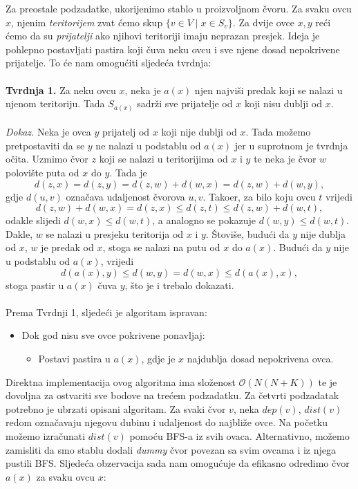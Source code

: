 Za preostale podzadatke, ukorijenimo stablo u proizvoljnom čvoru. Za svaku ovcu $x$, njenim \emph{teritorijem} zvat ćemo skup $\{v \in V \mid x \in S_v\}$. Za dvije ovce $x, y$ reći ćemo da su \emph{prijatelji} ako njihovi teritoriji imaju neprazan presjek. Ideja je pohlepno postavljati pastira koji čuva neku ovcu i sve njene dosad nepokrivene prijatelje. To će nam omogućiti sljedeća tvrdnja:
\\\\
\textbf{Tvrdnja 1.} Za neku ovcu $x$, neka je $a(x)$ njen najviši predak koji se nalazi u njenom teritoriju. Tada $S_{a(x)}$ sadrži sve prijatelje od $x$ koji nisu dublji od $x$.
\\\\
\textit{Dokaz.} Neka je ovca $y$ prijatelj od $x$ koji nije dublji od $x$. Tada možemo pretpostaviti da se $y$ ne nalazi u podstablu od $a(x)$ jer u suprotnom je tvrdnja očita. Uzmimo čvor $z$ koji se nalazi u teritorijima od $x$ i $y$ te neka je čvor $w$ polovište puta od $x$ do $y$. Tada je
$$d(z, x) = d(z, y) = d(z, w) + d(w, x) = d(z, w) + d(w, y),$$ gdje $d(u, v)$ označava udaljenost čvorova $u, v$. Tako\dj er, za bilo koju ovcu $t$ vrijedi $$d(z, w) + d(w, x) = d(z, x) \leq d(z, t) \leq d(z, w) + d(w, t),$$ odakle slijedi $d(w, x) \leq d(w, t)$, a analogno se pokazuje $d(w, y) \leq d(w, t)$. Dakle, $w$ se nalazi u presjeku teritorija od $x$ i $y$. Štoviše, budući da $y$ nije dublja od $x$, $w$ je predak od $x$, stoga se nalazi na putu od $x$ do $a(x)$. Budući da $y$ nije u podstablu od $a(x)$, vrijedi $$d(a(x), y) \leq d(w, y) = d(w, x) \leq d(a(x), x),$$ stoga pastir u $a(x)$ čuva $y$, što je i trebalo dokazati.
\\\\
Prema Tvrdnji 1, sljedeći je algoritam ispravan:
\begin{itemize}
    \item Dok god nisu sve ovce pokrivene ponavljaj:
    \begin{itemize}
        \item Postavi pastira u $a(x)$, gdje je $x$ najdublja dosad nepokrivena ovca.
    \end{itemize}
\end{itemize}
Direktna implementacija ovog algoritma ima složenost $\mathcal{O}(N(N + K))$ te je dovoljna za ostvariti sve bodove na trećem podzadatku. Za četvrti podzadatak potrebno je ubrzati opisani algoritam. Za svaki čvor $v$, neka $dep(v)$, $dist(v)$ redom označavaju njegovu dubinu i udaljenost do najbliže ovce. Na početku možemo izračunati $dist(v)$ pomoću BFS-a iz svih ovaca. Alternativno, možemo zamisliti da smo stablu dodali \emph{dummy} čvor povezan sa svim ovcama i iz njega pustili BFS. Sljedeća obzervacija sada nam omogućuje da efikasno odredimo čvor $a(x)$ za svaku ovcu $x$:
